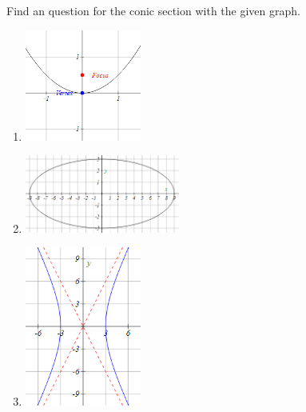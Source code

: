 \begin{exercise}
    Find an question for the conic section with the given graph.
    \begin{enumerate}
        \item \mbox{}

        \includegraphics[width=0.3\textwidth]{figs/ParabolaEqFromGraph.png}
        \item \mbox{}

        \includegraphics[width=0.4\textwidth]{figs/EllipseEqFromGraph.png}
        \item\mbox{}

        \includegraphics[width=0.3\textwidth]{figs/HyperbolaEqFromGraph.png}
    \end{enumerate}
\end{exercise}
